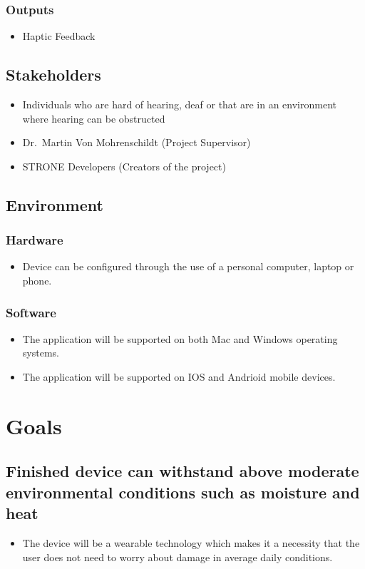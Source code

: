 \documentclass{article}
\begin{document}
\subsubsection {Outputs}
\begin{itemize}
    \item Haptic Feedback
\end{itemize}

\subsection{Stakeholders}
\begin{itemize}
    \item Individuals who are hard of hearing, deaf or that are in an environment where hearing can be obstructed
    \item Dr.\ Martin Von Mohrenschildt (Project Supervisor)
    \item STRONE Developers (Creators of the project)
\end{itemize}

\subsection{Environment}
\subsubsection{Hardware}
\begin{itemize}
    \item Device can be configured through the use of a personal computer, laptop or phone.
\end{itemize}
\subsubsection{Software}
\begin{itemize}
    \item The application will be supported on both Mac and Windows operating systems.
    \item The application will be supported on IOS and Andrioid mobile devices.   
\end{itemize}

\section{Goals}
\subsection{Finished device can withstand above moderate
environmental conditions such as moisture and
heat}
\begin{itemize}
    \item The device will be a wearable technology which makes it a necessity that the user does not need to worry about damage in average daily conditions.  
   \end{itemize} 
\end{document}
